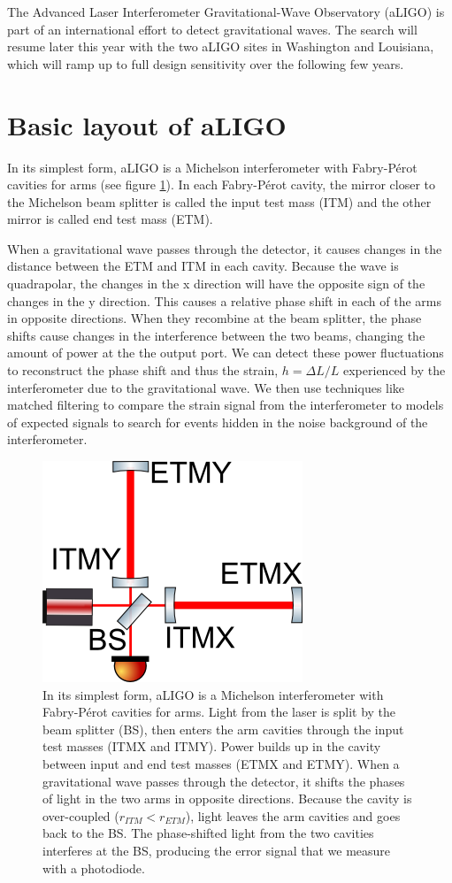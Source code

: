The Advanced Laser Interferometer Gravitational-Wave Observatory (aLIGO) is part of an international effort to detect gravitational waves. 
The search will resume later this year with the two aLIGO sites in Washington and Louisiana, which will ramp up to full design sensitivity over the following few years.

\section{Basic layout of aLIGO}

In its simplest form, aLIGO is a Michelson interferometer with Fabry-P\'erot cavities for arms (see figure \ref{fig:michelson}). In each Fabry-P\'erot cavity, the mirror closer to the Michelson beam splitter is called the input test mass (ITM) and the other mirror is called end test mass (ETM).

When a gravitational wave passes through the detector, it causes changes in the distance between the ETM and ITM in each cavity. Because the wave is quadrapolar, the changes in the x direction will have the opposite sign of the changes in the y direction. This causes a relative phase shift in each of the arms in opposite directions. When they recombine at the beam splitter, the phase shifts cause changes in the interference between the two beams, changing the amount of power at the the output port. We can detect these power fluctuations to reconstruct the phase shift and thus the strain, $h=\Delta L/L$ experienced by the interferometer due to the gravitational wave. We then use techniques like matched filtering to compare the strain signal from the interferometer to models of expected signals to search for events hidden in the noise background of the interferometer. 


\begin{figure}[htp]%
\center
\includegraphics[width=.5\textwidth]{figures/introduction/Michelson}%
\caption[Simplified LIGO Layout]{In its simplest form, aLIGO is a Michelson interferometer with Fabry-P\'erot cavities for arms. Light from the laser is split by the beam splitter (BS), then enters the arm cavities through the input test masses (ITMX and ITMY). Power builds up in the cavity between input and end test masses (ETMX and ETMY). When a gravitational wave passes through the detector, it shifts the phases of light in the two arms in opposite directions. Because the cavity is over-coupled ($r_{ITM}<r_{ETM}$), light leaves the arm cavities and goes back to the BS. The phase-shifted light from the two cavities interferes at the BS, producing the error signal that we measure with a photodiode.}%
\label{fig:michelson}
\end{figure}

